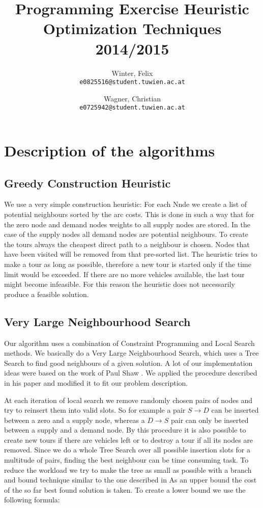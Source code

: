 \documentclass[a4paper]{scrartcl}
\author{
  Winter, Felix\\
  \texttt{e0825516@student.tuwien.ac.at}
  \and
  Wagner, Christian\\
  \texttt{e0725942@student.tuwien.ac.at}
}
\title{Programming Exercise Heuristic Optimization Techniques 2014/2015}
\begin{document}
\setlength{\abovedisplayskip}{0pt}
\setlength{\belowdisplayskip}{0pt}

\begingroup
 \makeatletter
 \maketitle
\endgroup

\section{Description of the algorithms}

\subsection{Greedy Construction Heuristic}

We use a very simple construction heuristic: For each Nnde we create a list of potential neighbours sorted by the arc costs.
This is done in such a way that for the zero node and demand nodes weights to all supply nodes are stored. In the case of the supply
nodes all demand nodes are potential neighbours.
To create the tours always the cheapest direct path to a neighbour is chosen. Nodes that have been visited will be removed from that
pre-sorted list. The heuristic tries to make a tour as long as possible, therefore a new tour is started only if the time limit would be exceeded.
If there are no more vehicles available, the last tour might become infeasible. For this reason the heuristic does not necessarily
produce a feasible solution.
\subsection{Very Large Neighbourhood Search}

Our algorithm uses a combination of Constraint Programming and Local Search methods. We basically do a Very Large Neighbourhood Search, which uses a Tree Search to find good neighbours of a given solution.
A lot of our implementation ideas were based on the work of Paul Shaw \cite{shaw1998using}. We applied the procedure described in his paper and modified it to fit our problem description.

At each iteration of local search we remove randomly chosen pairs of nodes and try to reinsert them into valid slots. So for example a pair $S \rightarrow D$ can be inserted between a zero and a supply node, whereas a $D \rightarrow S$ pair can only be inserted between a supply and a demand node. By this procedure it is also possible to create new tours if there are vehicles left or to destroy a tour if all its nodes are removed. Since we do a whole Tree Search over all possible insertion slots for a multitude of pairs, finding the best neighbour can be time consuming task. To reduce the workload we try to make the tree as small as possible with a branch and bound technique similar to the one described in \cite{shaw1998using}
As an upper bound the cost of the so far best found solution is taken. To create a lower bound we use the following formula:
\end{document}
